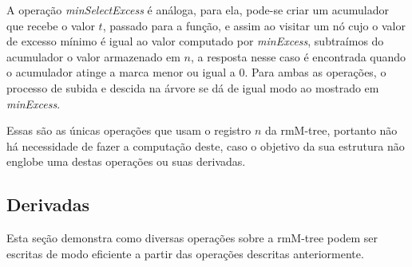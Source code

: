     A operação \textit{minSelectExcess} é análoga, para ela, pode-se criar um acumulador que recebe o valor $t$, passado para a função, e assim ao visitar um nó cujo o valor de excesso mínimo é igual ao valor computado por \textit{minExcess}, subtraímos do acumulador  o valor armazenado em $n$, a resposta nesse caso é encontrada quando o acumulador atinge a marca menor ou igual a $0$. Para ambas as operações, o processo de subida e descida na árvore se dá de igual modo ao mostrado em \textit{minExcess}.


    Essas são as únicas operações que usam o registro $n$ da rmM-tree, portanto não há necessidade de fazer a computação deste, caso o objetivo da sua estrutura não englobe uma destas operações ou suas derivadas.

    \subsection{Derivadas}
    Esta seção demonstra como diversas operações sobre a rmM-tree podem ser escritas de modo eficiente a partir das operações descritas anteriormente.

